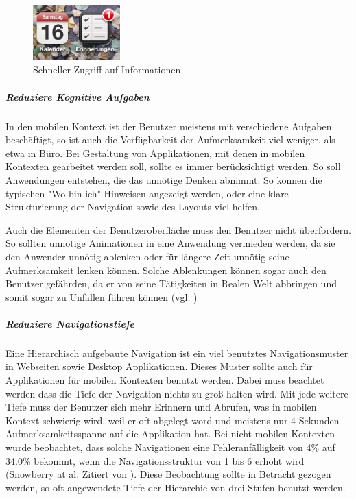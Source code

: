 \begin{figure}
	\begin{center}
	
	\includegraphics[width=0.3\textwidth]{img/iconIos.png}
	\caption{Schneller Zugriff auf Informationen}\label{fig:iconIos}
\end{center}
\end{figure}

\subparagraph{Reduziere Kognitive Aufgaben} 
\label{subp:reduziere_kognitive_aufgaben_}

In den mobilen Kontext ist der Benutzer meistens mit verschiedene Aufgaben beschäftigt, so ist auch die Verfügbarkeit der Aufmerksamkeit viel weniger, als etwa in Büro. Bei Gestaltung von Applikationen, mit denen in mobilen Kontexten gearbeitet werden soll, sollte es immer berücksichtigt werden. So soll Anwendungen entstehen, die das unnötige Denken abnimmt. So können die typischen "Wo bin ich" Hinweisen angezeigt werden, oder eine klare Strukturierung der Navigation sowie des Layouts viel helfen. 

Auch die Elementen der Benutzeroberfläche muss den Benutzer nicht überfordern. So sollten unnötige Animationen in eine Anwendung vermieden werden, da sie den Anwender unnötig ablenken oder für längere Zeit unnötig seine Aufmerksamkeit lenken können. Solche Ablenkungen können sogar auch den Benutzer gefährden, da er von seine Tätigkeiten in Realen Welt abbringen und somit sogar zu Unfällen führen können (vgl. \cite{Nasar:2008cc})

\subparagraph{Reduziere Navigationstiefe} 
\label{subp:reduziere_das_w_hlen}

Eine Hierarchisch aufgebaute Navigation ist ein viel benutztes Navigationsmuster in Webseiten sowie Desktop Applikationen. Dieses Muster sollte auch für Applikationen für mobilen Kontexten benutzt werden. Dabei muss beachtet werden dass die Tiefe der Navigation nichts zu groß halten wird. Mit jede weitere Tiefe muss der Benutzer sich mehr Erinnern und Abrufen, was in mobilen Kontext schwierig wird, weil er oft abgelegt word und meistens nur 4 Sekunden Aufmerksamkeitsspanne auf die Applikation hat\cite{Oulasvirta:2005vn}. Bei nicht mobilen Kontexten wurde beobachtet, dass solche Navigationen eine Fehleranfälligkeit von 4\% auf 34.0\% bekommt, wenn die Navigationsstruktur von 1 bis 6 erhöht wird (Snowberry at al. Zitiert von \cite{Chae:2004gp}). Diese Beobachtung sollte in Betracht gezogen werden, so oft angewendete Tiefe der Hierarchie von drei Stufen benutzt werden.


